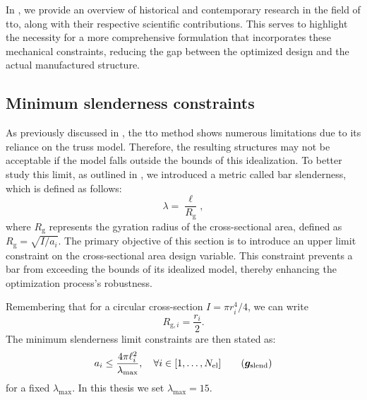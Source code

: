 In , we provide an overview of historical and contemporary research in the field of \gls{tto}, along with their respective scientific contributions. This serves to highlight the necessity for a more comprehensive formulation that incorporates these mechanical constraints, reducing the gap between the optimized design and the actual manufactured structure.
    
\subsection{Minimum slenderness constraints}
As previously discussed in , the \gls{tto} method shows numerous limitations due to its reliance on the truss model. Therefore, the resulting structures may not be acceptable if the model falls outside the bounds of this idealization. To better study this limit, as outlined in , we introduced a metric called bar slenderness, which is defined as follows:
\begin{equation}
    \lambda = \frac{\ell}{R_{\mathrm{g}}},
\end{equation}
where $R_{\mathrm{g}}$ represents the gyration radius of the cross-sectional area, defined as $R_{\mathrm{g}} = \sqrt{I/a_i}$.
The primary objective of this section is to introduce an upper limit constraint on the cross-sectional area design variable. This constraint prevents a bar from exceeding the bounds of its idealized model, thereby enhancing the optimization process's robustness.

Remembering that for a circular cross-section $I = \pi r_i^4/4$, we can write
\begin{equation}
    R_{\mathrm{g},i} = \frac{r_i}{2}.
\end{equation}
The minimum slenderness limit constraints are then stated as:
\begin{equation} \label{eq:04_slend_constraints}
    a_i \leq \frac{4 \pi \ell_i^2}{\lambda_{\text{max}}}, \quad \forall i \in [1,\ldots, N_{\text{el}}]
    \tag{$\vect{g}_{\text{slend}}$}
\end{equation}
for a fixed $\lambda_{\text{max}}$. In this thesis we set $\lambda_{\text{max}}=15$.

